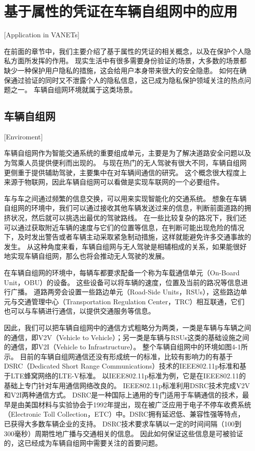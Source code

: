 

\chapter{基于属性的凭证在车辆自组网中的应用}[Application in VANETs]

在前面的章节中，我们主要介绍了基于属性的凭证的相关概念，以及在保护个人隐私方面所发挥的作用。
现实生活中有很多需要身份验证的场景，大多数的场景都缺少一种保护用户隐私的措施，这会给用户本身带来很大的安全隐患。
如何在确保通过验证的同时又不泄露个人的隐私信息，这已成为隐私保护领域关注的热点问题之一。
车辆自组网环境就属于这类场景。

\section{车辆自组网}[Enviroment]

车辆自组网作为智能交通系统的重要组成单元，主要是为了解决道路安全问题以及为驾乘人员提供便利而出现的。
与现在热门的无人驾驶有很大不同，车辆自组网更侧重于提供辅助驾驶，主要集中在对车辆间通信的研究。
这个概念很大程度上来源于物联网，因此车辆自组网可以看做是实现车联网的一个必要组件。

车与车之间通过频繁的信息交换，可以用来实现智能化的交通系统。
想象在车辆自组网的环境中，我们可以通过接收其他车辆发送过来的信息，判断前面道路的拥挤状况，然后就可以挑选出最优的驾驶路线。
在一些比较复杂的路况下，我们还可以通过获取附近车辆的速度与它们的位置等信息，在判断可能出现危险的情况下，及时发出警告或者车辆主动采取紧急制动措施，这样就能避免许多交通事故的发生。
从这种角度来看，车辆自组网与无人驾驶是相辅相成的关系，如果能很好地实现车辆自组网，那么也将会推动无人驾驶的发展。

在车辆自组网的环境中，每辆车都要求配备一个称为车载通信单元（On-Board Unit，OBU）的设备。
这些设备可以将车辆的速度，位置及当前的路况等信息进行广播。
道路两旁会设置一些路边单元（Road-Side Units，RSUs），这些路边单元与交通管理中心（Transportation Regulation Center，TRC）相互联通，它们也可以与车辆进行通信，以提供交通服务等信息。

因此，我们可以把车辆自组网中的通信方式粗略分为两类，一类是车辆与车辆之间的通信，即V2V（Vehicle to Vehicle）；另一类是车辆与RSUs这类的基础设施之间的通信，即V2I（Vehicle to Infrastructure）。
整个车辆自组网中的环境如图4-1所示。
目前的车辆自组网通信还没有形成统一的标准，比较有影响力的有基于DSRC（Dedicated Short Range Communications）技术的IEEE802.11p标准和基于LTE蜂窝网络的LTE-V标准。
以IEEE802.11p标准为例，它是在IEEE802.11的基础上专门针对车用通信网络改良的。
IEEE802.11p标准利用DSRC技术完成V2V和V2I两种通信方式。
DSRC是一种国际上通用的专门适用于车辆通信的技术，最早是由美国材料与实验协会于1992年提出，现在被广泛应用于电子不停车收费系统（Electronic Toll Collection，ETC）中。DSRC拥有延迟低、兼容性强等特点，已获得大多数车辆企业的支持。
DSRC技术要求车辆以一定的时间间隔（100到300毫秒）周期性地广播与交通相关的信息\cite{zhang2008raise}。
因此如何保证这些信息是可被验证的，这已经成为车辆自组网中需要关注的首要问题。

